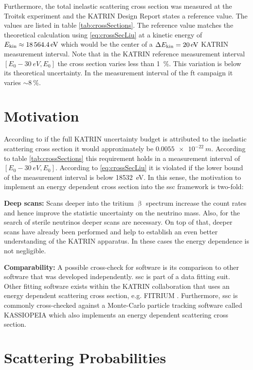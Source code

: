 Furthermore, the total inelastic scattering cross section was measured at the Troitsk experiment and the KATRIN Design Report states a reference value. The values are listed in table \ref{tab:crossSections}. The reference value matches the theoretical calculation using \eqref{eq:crossSecLiu} at a kinetic energy of $E_\mathrm{kin}\approx\SI{18564.4}{eV}$ which would be the center of a $\Delta E_\mathrm{kin}=\SI{20}{eV}$ KATRIN measurement interval. Note that in the KATRIN reference measurement interval $[E_0-\SI{30}{eV}, E_0]$ the cross section varies less than \SI{1}{\percent}. This variation is below its theoretical uncertainty. In the measurement interval of the \gls{ft} campaign it varies $\sim\SI{8}{\percent}$.
    
\section{Motivation}
According to \cite{Groh2015} if the full KATRIN uncertainty budget is attributed to the inelastic scattering cross section it would approximately be $\SI{0.0055e-22}{m}$. According to table \ref{tab:crossSections} this requirement holds in a measurement interval of $[E_0-\SI{30}{eV}, E_0]$. According to \eqref{eq:crossSecLiu} it is violated if the lower bound of the measurement interval is below \SI{18532}{eV}. In this sense, the motivation to implement an energy dependent cross section into the \gls{ssc} framework is two-fold:
\par{\textbf{Deep scans:} Scans deeper into the tritium $\upbeta$ spectrum increase the count rates and hence improve the statistic uncertainty on the neutrino mass. Also, for the search of sterile neutrinos deeper scans are necessary. On top of that, deeper scans have already been performed and help to establish an even better understanding of the KATRIN apparatus. In these cases the energy dependence is not negligible.}
\par{\textbf{Comparability:} A possible cross-check for software is its comparison to other software that was developed independently. \gls{ssc} is part of a data fitting suit. Other fitting software exists within the KATRIN collaboration that uses an energy dependent scattering cross section, e.g. FITRIUM \cite{Fitrium}. Furthermore, \gls{ssc} is commonly cross-checked against a Monte-Carlo particle tracking software called KASSIOPEIA \cite{KATRINCOL2019} which also implements an energy dependent scattering cross section.}
    
\section{Scattering Probabilities}
